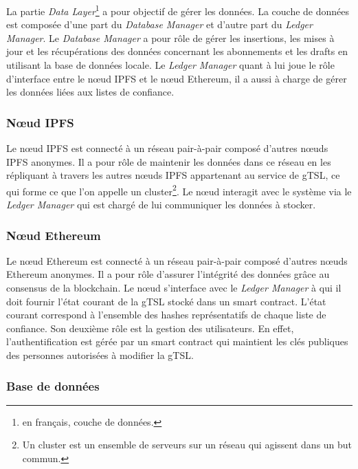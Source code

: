 \documentclass{tnreport}
\begin{document}
La partie \textit{Data Layer}\footnote{en français, couche de données.} a pour objectif de gérer les données. La couche de données est composée d'une part du \textit{Database Manager} et d'autre part du \textit{Ledger Manager}. Le \textit{Database Manager} a pour rôle de gérer les insertions, les mises à jour et les récupérations des données concernant les abonnements et les drafts en utilisant la base de données locale. Le \textit{Ledger Manager} quant à lui joue le rôle d'interface entre le nœud IPFS et le nœud Ethereum, il a aussi à charge de gérer les données liées aux listes de confiance.

\subsubsection{Nœud IPFS}

Le nœud IPFS est connecté à un réseau pair-à-pair composé d'autres nœuds IPFS anonymes. Il a pour rôle de maintenir les données dans ce réseau en les répliquant à travers les autres nœuds IPFS appartenant au service de gTSL, ce qui forme ce que l'on appelle un cluster\footnote{Un cluster est un ensemble de serveurs sur un réseau qui agissent dans un but commun.}. Le nœud interagit avec le système via le \textit{Ledger Manager} qui est chargé de lui communiquer les données à stocker.

\subsubsection{Nœud Ethereum}

Le nœud Ethereum est connecté à un réseau pair-à-pair composé d'autres nœuds Ethereum anonymes. Il a pour rôle d'assurer l'intégrité des données grâce au consensus de la blockchain. Le nœud s'interface avec le \textit{Ledger Manager} à qui il doit fournir l'état courant de la gTSL stocké dans un smart contract. L'état courant correspond à l'ensemble des hashes représentatifs de chaque liste de confiance. Son deuxième rôle est la gestion des utilisateurs. En effet, l'authentification est gérée par un smart contract qui maintient les clés publiques des personnes autorisées à modifier la gTSL.

\subsubsection{Base de données}
\end{document}

